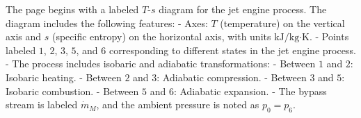 The page begins with a labeled \( T \)-\( s \) diagram for the jet engine process. The diagram includes the following features:  
- Axes: \( T \) (temperature) on the vertical axis and \( s \) (specific entropy) on the horizontal axis, with units \( \text{kJ/kg·K} \).  
- Points labeled \( 1 \), \( 2 \), \( 3 \), \( 5 \), and \( 6 \) corresponding to different states in the jet engine process.  
- The process includes isobaric and adiabatic transformations:  
  - Between \( 1 \) and \( 2 \): Isobaric heating.  
  - Between \( 2 \) and \( 3 \): Adiabatic compression.  
  - Between \( 3 \) and \( 5 \): Isobaric combustion.  
  - Between \( 5 \) and \( 6 \): Adiabatic expansion.  
- The bypass stream is labeled \( \dot{m}_M \), and the ambient pressure is noted as \( p_0 = p_6 \).